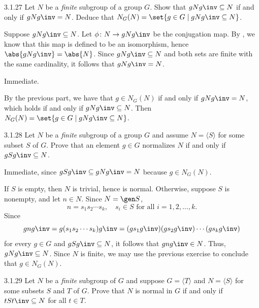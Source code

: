 \begin{exercise}{3.1.27}
    Let $N$ be a \emph{finite} subgroup of a group $G$.
	Show that $gNg\inv \subseteq N$ if and only if $gNg\inv  = N$.
	Deduce that $N_G(N) = \set{g \in G \mid gNg\inv  \subseteq N}$.
\end{exercise}

\begin{soliff}
    \rightimp Suppose $gNg\inv \subseteq N$.
	Let $\phi \colon N \to gNg\inv$ be the conjugation map.
	By , we know that this map is defined to be an isomorphism, hence $\abs{gNg\inv} = \abs{N}$.
	Since $gNg\inv \subseteq N$ and both sets are finite with the same cardinality, it follows that $gNg\inv = N$.

    \leftimp Immediate.

    By the previous part, we have that $g \in N_G(N)$ if and only if $gNg\inv = N$, which holds if and only if $gNg\inv \subseteq N$.
	Then $N_G(N) = \set{ g \in G \mid gNg\inv  \subseteq N }$.
\end{soliff}

\begin{exercise}{3.1.28}
    Let $N$ be a \emph{finite} subgroup of a group $G$ and assume $N = \langle S \rangle$ for some subset $S$ of $G$.
	Prove that an element $g \in G$ normalizes $N$ if and only if $gSg\inv  \subseteq N$.
\end{exercise}

\begin{soliff}
    \rightimp Immediate, since $gSg\inv \subseteq gNg\inv = N$ because $g \in N_G(N)$.

    \leftimp If $S$ is empty, then $N$ is trivial, hence is normal.
	Otherwise, suppose $S$ is nonempty, and let $n \in N$.
	Since $N = \gen S$,
    \[
    	n = s_1s_2 \cdots s_k, \quad s_i \in S \text{ for all } i = 1, 2, \ldots, k.
    \]
    Since
    \[
        gng\inv = g(s_1s_2 \cdots s_k)g\inv = (gs_1g\inv)(gs_2g\inv) \cdots (gs_kg\inv)
    \]
    for every $g \in G$ and $gSg\inv \subseteq N$, it follows that $gng\inv \in N$.
    Thus, $gNg\inv \subseteq N$.
	Since $N$ is finite, we may use the previous exercise to conclude that $g \in N_G(N)$.
\end{soliff}

\begin{exercise}{3.1.29}
    Let $N$ be a \emph{finite} subgroup of $G$ and suppose $G = \langle T \rangle$ and $N = \langle S \rangle$ for some subsets $S$ and $T$ of $G$.
	Prove that $N$ is normal in $G$ if and only if $tSt\inv  \subseteq N$ for all $t \in T$.
\end{exercise}

